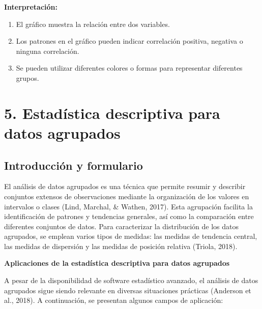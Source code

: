 \documentclass[
  spanish,
  letterpaper,
]{book}
\begin{document}
\textbf{Interpretación:}

\begin{enumerate}
\def\labelenumi{\arabic{enumi}.}
\item
  El gráfico muestra la relación entre dos variables.
\item
  Los patrones en el gráfico pueden indicar correlación positiva,
  negativa o ninguna correlación.
\item
  Se pueden utilizar diferentes colores o formas para representar
  diferentes grupos.
\end{enumerate}

\part{5. Estadística descriptiva para datos agrupados}


\chapter{Introducción y formulario}\label{introducciuxf3n-y-formulario}

El análisis de datos agrupados es una técnica que permite resumir y
describir conjuntos extensos de observaciones mediante la organización
de los valores en intervalos o clases (Lind, Marchal, \& Wathen, 2017).
Esta agrupación facilita la identificación de patrones y tendencias
generales, así como la comparación entre diferentes conjuntos de datos.
Para caracterizar la distribución de los datos agrupados, se emplean
varios tipos de medidas: las medidas de tendencia central, las medidas
de dispersión y las medidas de posición relativa (Triola, 2018).

\textbf{Aplicaciones de la estadística descriptiva para datos agrupados}

A pesar de la disponibilidad de software estadístico avanzado, el
análisis de datos agrupados sigue siendo relevante en diversas
situaciones prácticas (Anderson et al., 2018). A continuación, se
presentan algunos campos de aplicación:
\end{document}
